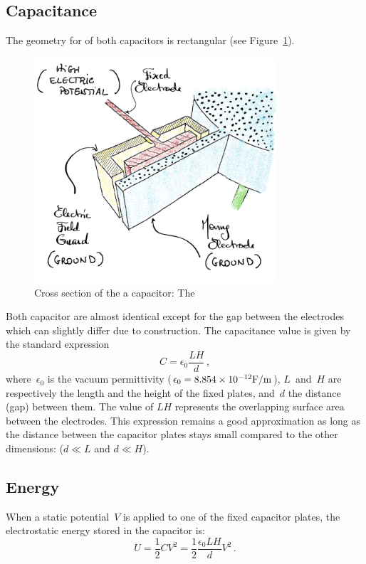 \subsection{Capacitance}
The geometry for of both capacitors is rectangular (see Figure~\ref{fig.StandardDesign2}).
\begin{figure}[htb]
	\captionsetup{width=.8\linewidth}
	\centering
	\includegraphics[width=9cm]{StdDesign2}
	\caption{ \small Cross section of the a capacitor: The }
	\label{fig.StandardDesign2}
\end{figure}
Both capacitor are almost identical except for the gap between the electrodes which can slightly differ due to construction. The capacitance value is given by the standard expression
\begin{equation}
C = \epsilon_0\frac{L H}{d}\,,
\end{equation}
where~$\epsilon_0$ is the vacuum permittivity ($\epsilon_0 = \epsilonzero $), $L$~and~$H$ are respectively the length and the height of the fixed plates, and~$d$ the distance (gap) between them. The value of $LH$ represents the overlapping surface area between the electrodes. This expression remains a good approximation as long as the distance between the capacitor plates stays small compared to the other dimensions: ($d\ll L$ and $d\ll H$).

\subsection{Energy}
When a static potential~$V$ is applied to one of the fixed capacitor plates, the electrostatic energy stored in the capacitor is:
\begin{equation}
U = \frac{1}{2}C V^2 =
\frac{1}{2} \frac{\epsilon_0 L H}{d} V^2 \,.
\end{equation}

